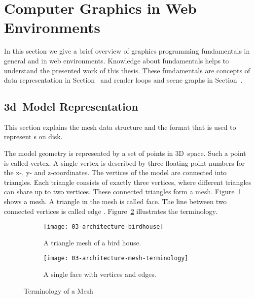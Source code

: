 \documentclass[../../ClassicThesis.tex]{subfiles}
\begin{document}
\section{Computer Graphics in Web Environments}
\label{sec:cg-web}

In this section we give a brief overview of graphics
programming fundamentals in general and in web environments.
Knowledge about fundamentals helps to understand the
presented work of this thesis. These fundamentals are
concepts of {\threedmodel} data representation in
Section~ and render
loops and scene graphs in
Section~.

\subsection{3d~Model Representation}
\label{sub:model-representation}

This section explains the mesh data structure and the {\stlfile}
format that is used to represent {\threedmodel}s on disk.

The model geometry is represented by a set of points in
3D~space. Such a point is called vertex. A single vertex is
described by three floating point numbers for the x-, y- and
z-coordinates. The vertices of the model are connected into
triangles. Each triangle consists of exactly three vertices,
where different triangles can share up to two vertices.
These connected triangles form a mesh.
Figure~\ref{fig:term-mesh:mesh} shows a mesh. A triangle in
the mesh is called face. The line between two connected
vertices is called edge \cite[p.~3]{intro-cg}.
Figure~\ref{fig:term-mesh:face} illustrates the terminology.

\begin{figure}[h]
  \centering
  \begin{subfigure}[b]{0.49\textwidth}
    \centering
    \texttt{[image: 03-architecture-birdhouse]}
    \caption{A triangle mesh of a bird house.}
    \label{fig:term-mesh:mesh}
  \end{subfigure}
  \begin{subfigure}[b]{0.49\textwidth}
    \centering
    \texttt{[image: 03-architecture-mesh-terminology]}
    \caption{A single face with vertices and edges.}
    \label{fig:term-mesh:face}
  \end{subfigure}
  \caption{Terminology of a Mesh}
  \label{fig:term-mesh}
\end{figure}
\end{document}
